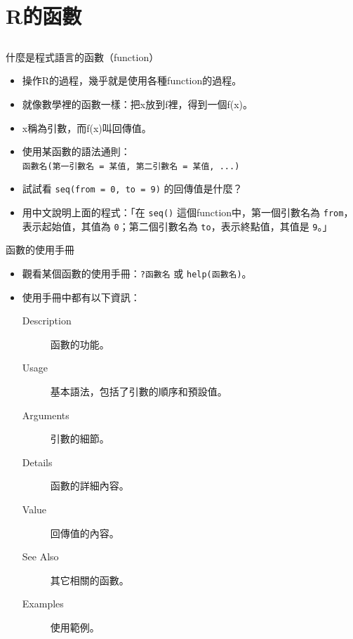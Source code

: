 \documentclass[12pt]{beamer}
\begin{document}
\section{R的函數}\subsection{}

\begin{frame}[fragile]{什麼是程式語言的函數（function）}
\begin{itemize}
\item 操作R的過程，幾乎就是使用各種function的過程。
\item 就像數學裡的函數一樣：把x放到f裡，得到一個f(x)。
\item x稱為引數，而f(x)叫回傳值。
\item 使用某函數的語法通則： \\ \verb+函數名(第一引數名 = 某值, 第二引數名 = 某值, ...)+ 
\item 試試看 \verb+seq(from = 0, to = 9)+ 的回傳值是什麼？
\item 用中文說明上面的程式：「在 \verb+seq()+ 這個function中，第一個引數名為 \verb+from+，表示起始值，其值為 \verb+0+；第二個引數名為 \verb+to+，表示終點值，其值是 \verb+9+。」
\end{itemize}
\end{frame}



\begin{frame}[fragile]{函數的使用手冊}
\begin{itemize}
\item 觀看某個函數的使用手冊：\verb+?函數名+ 或 \verb+help(函數名)+。
\item 使用手冊中都有以下資訊：
\begin{description}
	\item [Description] 函數的功能。
	\item [Usage] 基本語法，包括了引數的順序和預設值。
	\item [Arguments] 引數的細節。
	\item [Details] 函數的詳細內容。
	\item [Value] 回傳值的內容。
	\item [See Also] 其它相關的函數。
	\item [Examples] 使用範例。
\end{description}
\end{itemize}
\end{frame}
\end{document}
